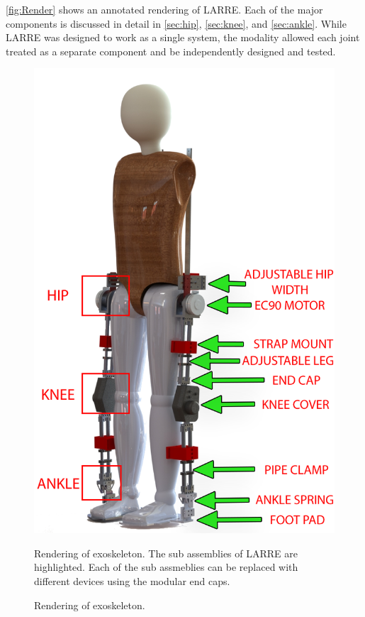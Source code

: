  \autoref{fig:Render} shows an annotated rendering of LARRE.  Each of the major components is discussed in detail in  \autoref{sec:hip}, \autoref{sec:knee}, and \autoref{sec:ankle}. While LARRE was designed to work as a single system, the modality allowed each joint treated as a separate component and be independently designed and tested. 

\begin{figure}[h!]
    \centering
    \includegraphics[scale=0.25]{images/mech_design/rendering2.png}
    \caption{Rendering of exoskeleton.}{Rendering of exoskeleton. The sub assemblies of LARRE are highlighted. Each of the sub assmeblies can be replaced with different devices using the modular end caps.}
    \label{fig:Render}
\end{figure}

